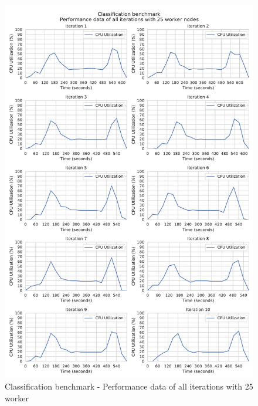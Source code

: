 \begin{figure}[h]
\centering
\includegraphics[scale=0.5]{images/appendix/evaluation_data/classification_benchmark/classification_25_worker_cpu_performance}
\caption{Classification benchmark - Performance data of all iterations with 25 worker}
\label{fig:appendix_eval_classification_static25}
\end{figure}

